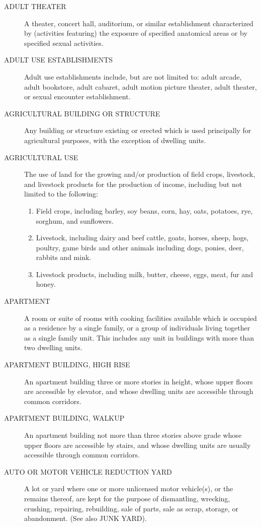 \begin{description}
    \item[ADULT THEATER] A theater, concert hall, auditorium, or similar establishment characterized by (activities featuring) the exposure of specified anatomical areas or by specified sexual activities.
    \item[ADULT USE ESTABLISHMENTS] Adult use establishments include, but are not limited to: adult arcade, adult bookstore, adult cabaret, adult motion picture theater, adult theater, or sexual encounter establishment.
    \item[AGRICULTURAL BUILDING OR STRUCTURE] Any building or structure existing or erected which is used principally for agricultural purposes, with the exception of dwelling units.
    \item[AGRICULTURAL USE] The use of land for the growing and/or production of field crops, livestock, and livestock products for the production of income, including but not limited to the following:
        \begin{enumerate}
            \item Field crops, including barley, soy beans, corn, hay, oats, potatoes, rye, sorghum, and sunflowers.
            \item Livestock, including dairy and beef cattle, goats, horses, sheep, hogs, poultry, game birds and other animals including dogs, ponies, deer, rabbits and mink.
            \item Livestock products, including milk, butter, cheese, eggs, meat, fur and honey.
        \end{enumerate}
    \item[APARTMENT] A room or suite of rooms with cooking facilities available which is occupied as a residence by a single family, or a group of individuals living together as a single family unit.  This includes any unit in buildings with more than two dwelling units.
    \item[APARTMENT BUILDING, HIGH RISE] An apartment building three or more stories in height, whose upper floors are accessible by elevator, and whose dwelling units are accessible through common corridors.
    \item[APARTMENT BUILDING, WALKUP] An apartment building not more than three stories above grade whose upper floors are accessible by stairs, and whose dwelling units are usually accessible through common corridors.
    \item[AUTO OR MOTOR VEHICLE REDUCTION YARD] A lot or yard where one or more unlicensed motor vehicle(s), or the remains thereof, are kept for the purpose of dismantling, wrecking, crushing, repairing, rebuilding, sale of parts, sale as scrap, storage, or abandonment. (See also JUNK YARD).

\end{description}
